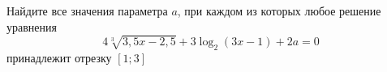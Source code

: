 \begin{ex}
	\begin{condition}
		Найдите все значения параметра \( a \), при каждом из которых любое решение уравнения \[ 4\sqrt[3]{3,5x-2,5}+3\log_2(3x-1)+2a=0 \] принадлежит отрезку \( [1;3] \)
	\end{condition}
\end{ex}